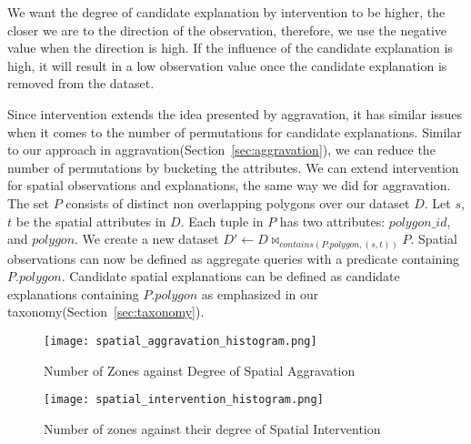We want the degree of candidate explanation by intervention to be higher, the closer we are to the direction of the observation, therefore, we use the negative value when the direction is high. If the influence of the candidate explanation is high, it will result in a low observation value once the candidate explanation is removed from the dataset.

Since intervention extends the idea presented by aggravation, it has similar issues when it comes to the number of permutations for candidate explanations. Similar to our approach in aggravation(Section~\ref{sec:aggravation}), we can reduce the number of permutations by bucketing the attributes. We can extend intervention for spatial observations and explanations, the same way we did for aggravation. The set $P$ consists of distinct non overlapping polygons over our dataset $D$. Let $s$,$t$ be the spatial attributes in $D$. Each tuple in $P$ has two attributes: $polygon\_id$, and $polygon$. We create a new dataset
$D' \leftarrow D \bowtie_{contains(P.polygon,(s,t))} P$. Spatial observations can now be defined as aggregate queries with a predicate containing $P.polygon$. Candidate spatial explanations can be defined as candidate explanations containing $P.polygon$ as emphasized in our taxonomy(Section~\ref{sec:taxonomy}).

\begin{figure}[ht]
\begin{center}
\texttt{[image: spatial\_aggravation\_histogram.png]}
\end{center}
\caption{Number of Zones against Degree of Spatial Aggravation}
\label{fig:spatial_aggravation_histogram}
\end{figure}

\begin{figure}[ht]
\begin{center}
\texttt{[image: spatial\_intervention\_histogram.png]}
\end{center}
\caption{Number of zones against their degree of Spatial Intervention}
\label{fig:spatial_intervention_histogram}
\end{figure}

